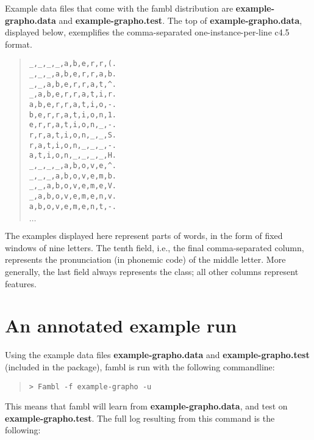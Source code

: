 \documentclass[11pt]{article}
\begin{document}
Example data files that come with the {\sc fambl} distribution are
{\bf example-grapho.data} and {\bf example-grapho.test}. The top of
{\bf example-grapho.data}, displayed below, exemplifies the
comma-separated one-instance-per-line {\sc c4.5} format.

\begin{quote}
{\tiny
\begin{verbatim}
_,_,_,_,a,b,e,r,r,(.
_,_,_,a,b,e,r,r,a,b.
_,_,a,b,e,r,r,a,t,^.
_,a,b,e,r,r,a,t,i,r.
a,b,e,r,r,a,t,i,o,-.
b,e,r,r,a,t,i,o,n,1.
e,r,r,a,t,i,o,n,_,-.
r,r,a,t,i,o,n,_,_,S.
r,a,t,i,o,n,_,_,_,-.
a,t,i,o,n,_,_,_,_,H.
_,_,_,_,a,b,o,v,e,^.
_,_,_,a,b,o,v,e,m,b.
_,_,a,b,o,v,e,m,e,V.
_,a,b,o,v,e,m,e,n,v.
a,b,o,v,e,m,e,n,t,-.
\end{verbatim}
$\ldots$
}
\end{quote}

The examples displayed here represent parts of words, in the form of
fixed windows of nine letters. The tenth field, i.e., the final
comma-separated column, represents the pronunciation (in phonemic
code) of the middle letter. More generally, the last field always
represents the class; all other columns represent features.

\section{An annotated example run}
\label{examples}

Using the example data files {\bf example-grapho.data} and {\bf
example-grapho.test} (included in the package), {\sc fambl} is run
with the following commandline:

\begin{quote}
{\footnotesize
\begin{verbatim}
> Fambl -f example-grapho -u
\end{verbatim}
}
\end{quote}

This means that {\sc fambl} will learn from {\bf example-grapho.data},
and test on {\bf example-grapho.test}.  The full log resulting from
this command is the following:
\end{document}
